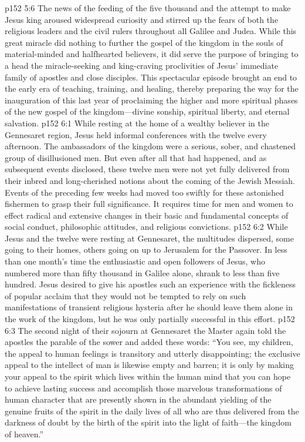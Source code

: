 \vs p152 5:6 The news of the feeding of the five thousand and the attempt to make Jesus king aroused widespread curiosity and stirred up the fears of both the religious leaders and the civil rulers throughout all Galilee and Judea. While this great miracle did nothing to further the gospel of the kingdom in the souls of material\hyp{}minded and halfhearted believers, it did serve the purpose of bringing to a head the miracle\hyp{}seeking and king\hyp{}craving proclivities of Jesus’ immediate family of apostles and close disciples. This spectacular episode brought an end to the early era of teaching, training, and healing, thereby preparing the way for the inauguration of this last year of proclaiming the higher and more spiritual phases of the new gospel of the kingdom---divine sonship, spiritual liberty, and eternal salvation.
\vs p152 6:1 While resting at the home of a wealthy believer in the Gennesaret region, Jesus held informal conferences with the twelve every afternoon. The ambassadors of the kingdom were a serious, sober, and chastened group of disillusioned men. But even after all that had happened, and as subsequent events disclosed, these twelve men were not yet fully delivered from their inbred and long\hyp{}cherished notions about the coming of the Jewish Messiah. Events of the preceding few weeks had moved too swiftly for these astonished fishermen to grasp their full significance. It requires time for men and women to effect radical and extensive changes in their basic and fundamental concepts of social conduct, philosophic attitudes, and religious convictions.
\vs p152 6:2 While Jesus and the twelve were resting at Gennesaret, the multitudes dispersed, some going to their homes, others going on up to Jerusalem for the Passover. In less than one month’s time the enthusiastic and open followers of Jesus, who numbered more than fifty thousand in Galilee alone, shrank to less than five hundred. Jesus desired to give his apostles such an experience with the fickleness of popular acclaim that they would not be tempted to rely on such manifestations of transient religious hysteria after he should leave them alone in the work of the kingdom, but he was only partially successful in this effort.
\pc \vs p152 6:3 The second night of their sojourn at Gennesaret the Master again told the apostles the parable of the sower and added these words: \textcolor{ubdarkred}{“You see, my children, the appeal to human feelings is transitory and utterly disappointing; the exclusive appeal to the intellect of man is likewise empty and barren; it is only by making your appeal to the spirit which lives within the human mind that you can hope to achieve lasting success and accomplish those marvelous transformations of human character that are presently shown in the abundant yielding of the genuine fruits of the spirit in the daily lives of all who are thus delivered from the darkness of doubt by the birth of the spirit into the light of faith---the kingdom of heaven.”}

